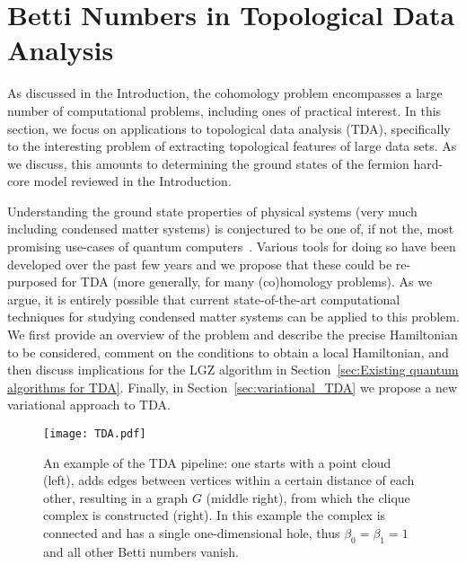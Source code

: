 \documentclass[11pt]{article}
\numberwithin{equation}{section}
\renewcommand\( {\left(}
\renewcommand\) {\right)}
\begin{document}
\section{Betti Numbers in Topological Data Analysis}
\label{sec:Betti numbers in Topological Data Analysis}


As discussed in the Introduction, the cohomology problem encompasses a large number of computational problems, including ones of practical interest. In this section, we focus on applications to topological data analysis (TDA), specifically to the interesting problem of extracting topological features of large data sets. As we discuss, this amounts to determining the ground states of the fermion hard-core model reviewed in the Introduction. 

Understanding the ground state properties of physical systems (very much including condensed matter systems) is conjectured to be one of, if not the, most promising use-cases of quantum computers~\cite{cao2019quantum, mcclean2021foundations}. Various tools for doing so have been developed over the past few years and we propose that these could be re-purposed for TDA (more generally, for many (co)homology problems). As we argue, it is entirely possible that current state-of-the-art computational techniques for studying condensed matter systems can be applied to this problem.  We first provide an overview of the problem and describe the precise Hamiltonian to be considered, comment on the conditions to obtain a local Hamiltonian, and then discuss implications for the LGZ algorithm in Section~\ref{sec:Existing quantum algorithms for TDA}. Finally, in Section~\ref{sec:variational_TDA} we propose a new variational approach to TDA.

\begin{figure}[t]
\begin{center}
\texttt{[image: TDA.pdf]}
\end{center}
\caption{An example of the TDA pipeline: one starts with a point cloud (left), adds edges between vertices within a certain distance of each other, resulting in a graph $G$ (middle right), from which the clique  complex is constructed (right). In this example the complex is connected and has a single one-dimensional hole, thus $\beta_0=\beta_1=1$ and all other Betti numbers vanish. }
\label{fig:simplex}
\end{figure}
\end{document}
